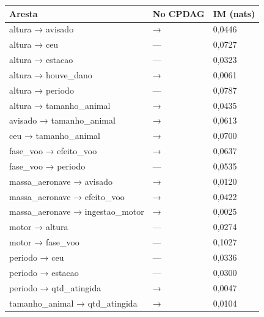 \begin{tabular}{lll}
\toprule
Aresta & No CPDAG & IM (nats) \\
\midrule
altura → avisado & → & 0,0446 \\
altura → ceu & — & 0,0727 \\
altura → estacao & — & 0,0323 \\
altura → houve\_dano & → & 0,0061 \\
altura → periodo & — & 0,0787 \\
altura → tamanho\_animal & → & 0,0435 \\
avisado → tamanho\_animal & → & 0,0613 \\
ceu → tamanho\_animal & → & 0,0700 \\
fase\_voo → efeito\_voo & → & 0,0637 \\
fase\_voo → periodo & — & 0,0535 \\
massa\_aeronave → avisado & → & 0,0120 \\
massa\_aeronave → efeito\_voo & → & 0,0422 \\
massa\_aeronave → ingestao\_motor & → & 0,0025 \\
motor → altura & — & 0,0274 \\
motor → fase\_voo & — & 0,1027 \\
periodo → ceu & — & 0,0336 \\
periodo → estacao & — & 0,0300 \\
periodo → qtd\_atingida & → & 0,0047 \\
tamanho\_animal → qtd\_atingida & → & 0,0104 \\
\bottomrule
\end{tabular}
